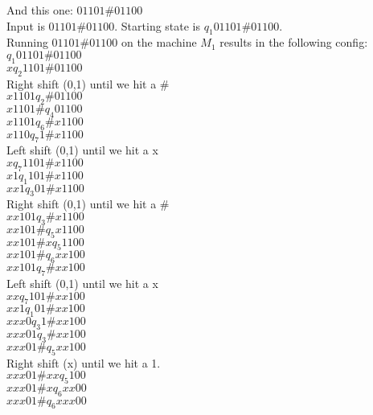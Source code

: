 \documentclass[12pt]{article}
\begin{document}
\pagebreak
And this one: $01101\#01100$ \\

Input is $01101\#01100$. Starting state is $q_1 01101\#01100$. \\
Running $01101\#01100$ on the machine $M_1$ results in the following config: \\

$                   q_1 01101 \# 01100$ \\
$x                  q_2  1101 \# 01100$ \\
Right shift (0,1) until we hit a $\#$   \\
$x1101              q_2       \# 01100$ \\
$x1101 \#           q_4          01100$ \\
$x1101              q_6       \# x1100$ \\
$x110               q_7     1 \# x1100$ \\
Left shift (0,1) until we hit a x       \\
$x                  q_7  1101 \# x1100$ \\
$x1                 q_1   101 \# x1100$ \\
$xx1                q_3    01 \# x1100$ \\
Right shift (0,1) until we hit a $\#$   \\
$xx101              q_3       \# x1100$ \\
$xx101 \#           q_5          x1100$ \\
$xx101 \# x         q_5           1100$ \\
$xx101 \#           q_6          xx100$ \\
$xx101              q_7       \# xx100$ \\
Left shift (0,1) until we hit a x       \\
$xx                 q_7   101 \# xx100$ \\
$xx1                q_1    01 \# xx100$ \\
$xxx0               q_3     1 \# xx100$ \\
$xxx01              q_3       \# xx100$ \\
$xxx01 \#           q_5          xx100$ \\
Right shift (x) until we hit a 1.       \\
$xxx01 \# xx        q_5            100$ \\
$xxx01 \# x         q_6           xx00$ \\
$xxx01 \#           q_6          xxx00$ \\
\end{document}
